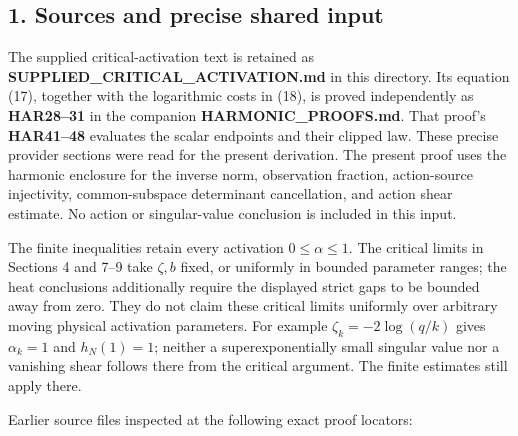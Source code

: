 \documentclass[11pt]{article}
\begin{document}
\subsection{1. Sources and precise shared input}\label{sources-and-precise-shared-input}

The supplied critical-activation text is retained as \textbf{SUPPLIED\_CRITICAL\_ACTIVATION.md} in this directory. Its equation (17), together with the logarithmic costs in (18), is proved independently as \textbf{HAR28--31} in the companion \textbf{HARMONIC\_PROOFS.md}. That proof's \textbf{HAR41--48} evaluates the scalar endpoints and their clipped law. These precise provider sections were read for the present derivation. The present proof uses the harmonic enclosure for the inverse norm, observation fraction, action-source injectivity, common-subspace determinant cancellation, and action shear estimate. No action or singular-value conclusion is included in this input.

The finite inequalities retain every activation \(0\le\alpha\le1\). The critical limits in Sections 4 and 7--9 take \(\zeta,b\) fixed, or uniformly in bounded parameter ranges; the heat conclusions additionally require the displayed strict gaps to be bounded away from zero. They do not claim these critical limits uniformly over arbitrary moving physical activation parameters. For example \(\zeta_k=-2\log(q/k)\) gives \(\alpha_k=1\) and \(h_N(1)=1\); neither a superexponentially small singular value nor a vanishing shear follows there from the critical argument. The finite estimates still apply there.

Earlier source files inspected at the following exact proof locators:
\end{document}
